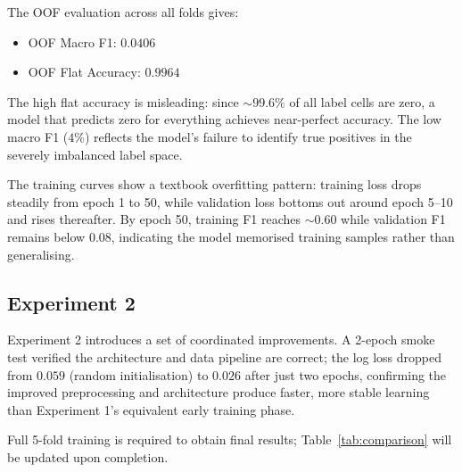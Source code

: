 \documentclass[12pt, a4paper]{article}
\begin{document}
The OOF evaluation across all folds gives:
\begin{itemize}[noitemsep]
    \item OOF Macro F1: $0.0406$
    \item OOF Flat Accuracy: $0.9964$
\end{itemize}

The high flat accuracy is misleading: since $\sim 99.6\%$ of all label cells are zero, a model that predicts zero for everything achieves near-perfect accuracy. The low macro F1 ($4\%$) reflects the model's failure to identify true positives in the severely imbalanced label space.

The training curves show a textbook overfitting pattern: training loss drops steadily from epoch 1 to 50, while validation loss bottoms out around epoch 5--10 and rises thereafter. By epoch 50, training F1 reaches $\sim 0.60$ while validation F1 remains below $0.08$, indicating the model memorised training samples rather than generalising.

\subsection{Experiment 2}

Experiment 2 introduces a set of coordinated improvements. A 2-epoch smoke test verified the architecture and data pipeline are correct; the log loss dropped from $0.059$ (random initialisation) to $0.026$ after just two epochs, confirming the improved preprocessing and architecture produce faster, more stable learning than Experiment 1's equivalent early training phase.

Full 5-fold training is required to obtain final results; Table~\ref{tab:comparison} will be updated upon completion.
\end{document}

